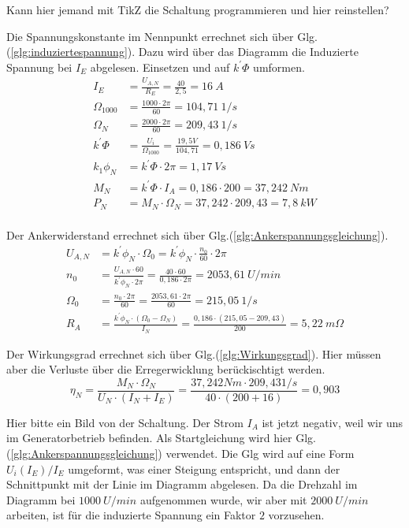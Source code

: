\begin{solution}
\begin{compactenum}
\item Kann hier jemand mit TikZ die Schaltung programmieren und hier reinstellen?
\item Die Spannungskonstante im Nennpunkt errechnet sich über Glg.(\ref{glg:induziertespannung}). Dazu wird über das Diagramm die Induzierte Spannung bei $I_E$ abgelesen. Einsetzen und auf $k^{'}\Phi$ umformen.
\begin{align}
I_E &= \frac{U_{A,N}}{R_E}=\frac{40}{2,5} = 16~A\\
\Omega_{1000}&= \frac{1000 \cdot 2 \pi}{60} = 104,71~ 1/s\\
\Omega_N&= \frac{2000 \cdot 2 \pi}{60} = 209,43~ 1/s\\
k^{'}\Phi &= \frac{U_i}{\Omega_{1000}} = \frac{19,5V}{104,71}=0,186 ~Vs\\
k_1 \phi_N &= k^{'}\Phi \cdot 2 \pi = 1,17~Vs\\
M_N&=k^{'}\Phi \cdot I_A =0,186 \cdot 200 = 37,242 ~Nm \\
P_N &= M_N \cdot \Omega_N = 37,242 \cdot 209,43 = 7,8 ~kW\\
\end{align}
\item Der Ankerwiderstand errechnet sich über Glg.(\ref{glg:Ankerspannungsgleichung}).
\begin{align}
U_{A,N} & = k^{'}\phi_N \cdot \Omega_0 = k^{'}\phi_N \cdot \frac{n_0}{60} \cdot 2 \pi \\
n_0 & = \frac{U_{A,N} \cdot 60}{k^{'}\phi_N \cdot 2 \pi} = \frac{40 \cdot 60}{0,186 \cdot 2 \pi} = 2053,61 ~U/min\\
\Omega_0 &= \frac{n_0 \cdot 2 \pi}{60} = \frac{2053,61 \cdot 2 \pi}{60}=215,05~1/s\\
R_A &= \frac{k^{'}\phi_N \cdot (\Omega_0 -\Omega_N)}{I_N} =\frac{0,186 \cdot (215,05 -209,43)}{200} = 5,22~m\Omega
\end{align}
\item Der Wirkungsgrad errechnet sich über Glg.(\ref{glg:Wirkungsgrad}). Hier müssen aber die Verluste über die Erregerwicklung berückischtigt werden.
\begin{equation}
\eta_N = \frac{M_N \cdot \Omega_N}{U_N \cdot (I_N+ I_E)} = \frac{37,242 Nm \cdot 209,43 1/s}{40 \cdot (200 + 16)}=0,903
\end{equation}
\item Hier bitte ein Bild von der Schaltung. Der Strom $I_A$ ist jetzt negativ, weil wir uns im Generatorbetrieb befinden. Als Startgleichung wird hier Glg.(\ref{glg:Ankerspannungsgleichung}) verwendet. Die Glg wird auf eine Form $U_i(I_E)/I_E$ umgeformt, was einer Steigung entspricht, und dann der Schnittpunkt mit der Linie im Diagramm abgelesen. Da die Drehzahl im Diagramm bei $1000 ~U/min$ aufgenommen wurde, wir aber mit $2000~U/min$ arbeiten, ist für die induzierte Spannung ein Faktor $2$ vorzusehen.

\end{compactenum}
\end{solution}
